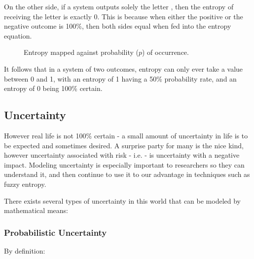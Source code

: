On the other side, if a system outputs solely the letter , then the entropy of receiving the letter  is exactly 0. This is because when either the positive or the negative outcome is 100\%, then both sides equal  when fed into the entropy equation.
\begin{figure}[H]
\begin{center}
\end{center}
\caption{Entropy mapped against probability ($p$) of occurrence.}
\label{fig:entropy}
\end{figure}

It follows that in a system of two outcomes, entropy can only ever take a value between 0 and 1, with an entropy of 1 having a 50\% probability rate, and an entropy of 0 being 100\% certain.

\subsection{Uncertainty}

However real life is not 100\% certain - a small amount of uncertainty in life is to be expected and sometimes desired. A surprise party for many is the nice kind, however uncertainty associated with risk - i.e.  - is uncertainty with a negative impact. Modeling uncertainty is especially important to researchers so they can understand it, and then continue to use it to our advantage in techniques such as fuzzy entropy.

There exists several types of uncertainty in this world that can be modeled by mathematical means:

\subsubsection{Probabilistic Uncertainty}

By definition:

